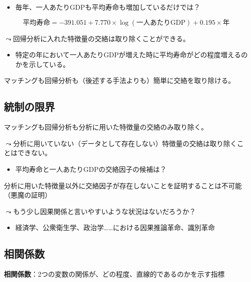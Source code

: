 \documentclass[
  xelatex,
  ja=standard]{bxjsarticle}
\providecommand{\tightlist}{%
  \setlength{\itemsep}{0pt}\setlength{\parskip}{0pt}}\usepackage{longtable,booktabs,array}
\begin{document}
\begin{itemize}
\tightlist
\item
  毎年、一人あたりGDPも平均寿命も増加しているだけでは？
\end{itemize}

\[
\textrm{平均寿命} = -391.051 + 7.770 \times \log(\textrm{一人あたりGDP}) + 0.195 \times \textrm{年}
\]

\(\leadsto\)回帰分析に入れた特徴量の交絡は取り除くことができる。

\begin{itemize}
\tightlist
\item
  特定の年において一人あたりGDPが増えた時に平均寿命がどの程度増えるのかを示している。
\end{itemize}

マッチングも回帰分析も（後述する手法よりも）簡単に交絡を取り除ける。

\hypertarget{ux7d71ux5236ux306eux9650ux754c}{%
\subsection{統制の限界}\label{ux7d71ux5236ux306eux9650ux754c}}

マッチングも回帰分析も分析に用いた特徴量の交絡のみ取り除く。

\(\leadsto\)分析に用いていない（データとして存在しない）特徴量の交絡は取り除くことはできない。

\begin{itemize}
\tightlist
\item
  平均寿命と一人あたりGDPの交絡因子の候補は？
\end{itemize}

分析に用いた特徴量以外に交絡因子が存在しないことを証明することは不可能（悪魔の証明）

\(\leadsto\)もう少し因果関係と言いやすいような状況はないだろうか？

\begin{itemize}
\tightlist
\item
  経済学、公衆衛生学、政治学\ldots\ldots における因果推論革命、識別革命
\end{itemize}

\hypertarget{ux76f8ux95a2ux4fc2ux6570}{%
\subsection{相関係数}\label{ux76f8ux95a2ux4fc2ux6570}}

\textbf{相関係数}：2つの変数の関係が、どの程度、直線的であるのかを示す指標
\end{document}
